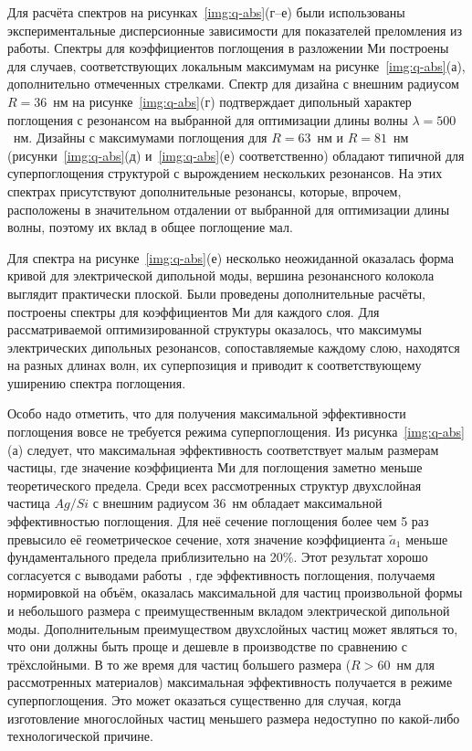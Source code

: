 Для расчёта спектров на рисунках~\ref{img:q-abs}(г--е) были
использованы экспериментальные дисперсионные зависимости для
показателей преломления из работы\cite{palik-1997}. Спектры для
коэффициентов поглощения в разложении Ми построены для случаев,
соответствующих локальным максимумам на рисунке~\ref{img:q-abs}(а),
дополнительно отмеченных стрелками.  Спектр для дизайна с внешним
радиусом $R=36$~нм на рисунке~\ref{img:q-abs}(г) подтверждает
дипольный характер поглощения с резонансом на выбранной для
оптимизации длины волны $\lambda=500$~нм.  Дизайны с
максимумами поглощения для $R=63$~нм и $R=81$~нм
(рисунки~\ref{img:q-abs}(д) и~\ref{img:q-abs}(е) соответственно)
обладают типичной для суперпоглощения структурой с вырождением
нескольких резонансов. На этих спектрах присутствуют дополнительные
резонансы, которые, впрочем, расположены в значительном отдалении от
выбранной для оптимизации длины волны, поэтому их вклад в общее
поглощение мал.

Для спектра на рисунке~\ref{img:q-abs}(е) несколько неожиданной
оказалась форма кривой для электрической дипольной моды, вершина
резонансного колокола выглядит практически плоской.  Были проведены
дополнительные расчёты, построены спектры для коэффициентов Ми для
каждого слоя. Для рассматриваемой оптимизированной структуры
оказалось, что максимумы электрических дипольных резонансов,
сопоставляемые каждому слою, находятся на разных длинах волн, их
суперпозиция и приводит к соответствующему уширению спектра
поглощения.

Особо надо отметить, что для получения максимальной эффективности
поглощения вовсе не требуется режима суперпоглощения.  Из
рисунка~\ref{img:q-abs}(а) следует, что максимальная эффективность
соответствует малым размерам частицы, где значение коэффициента Ми для
поглощения заметно меньше теоретического предела.  Среди всех
рассмотренных структур двухслойная частица $Ag/Si$ с внешним радиусом
36~нм обладает максимальной эффективностью поглощения.  Для неё
сечение поглощения более чем 5 раз превысило её геометрическое
сечение, хотя значение коэффициента $\tilde{a}_1$ меньше
фундаментального предела приблизительно на 20\%.  Этот результат
хорошо согласуется с выводами работы~\cite{Miller-2014}, где
эффективность поглощения, получаемя нормировкой на объём, оказалась
максимальной для частиц произвольной формы и небольшого размера с
преимущественным вкладом электрической дипольной моды.  Дополнительным
преимуществом двухслойных частиц может являться то, что они должны
быть проще и дешевле в производстве по сравнению с трёхслойными.  В то
же время для частиц большего размера ($R>60$~нм для рассмотренных
материалов) максимальная эффективность получается в режиме
суперпоглощения.  Это может оказаться существенно для случая, когда
изготовление многослойных частиц меньшего размера недоступно по
какой-либо технологической причине.

